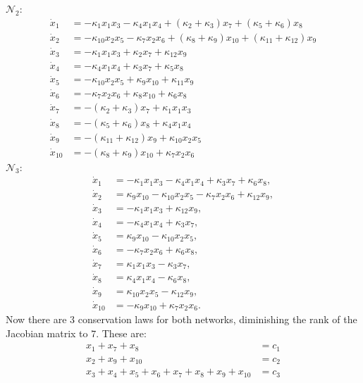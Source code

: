 $\mathcal{N}_2$:
\[
	\begin{aligned}
		\dot{x}_1&=-\kappa_{1}x_{1}x_{3}-\kappa_{4}x_{1}x_{4}+(\kappa_{2}+\kappa_{3})x_{7}+(\kappa_{5}+\kappa_{6})x_{8}\\\dot{x}_2&=-\kappa_{10}x_{2}x_{5}-\kappa_{7}x_{2}x_{6}+(\kappa_{8}+\kappa_{9})x_{10}+(\kappa_{11}+\kappa_{12})x_{9}\\\dot{x}_3&=-\kappa_1x_1x_3+\kappa_2x_7+\kappa_{12}x_9\\\dot{x}_4&=-\kappa_4x_1x_4+\kappa_3x_7+\kappa_5x_8\\\dot{x}_5&=-\kappa_{10}x_2x_5+\kappa_9x_{10}+\kappa_{11}x_9\\\dot{x}_6&=-\kappa_7x_2x_6+\kappa_8x_{10}+\kappa_6x_8\\\dot{x}_7&=-(\kappa_2+\kappa_3)x_7+\kappa_1x_1x_3\\\dot{x}_8&=-(\kappa_5+\kappa_6)x_8+\kappa_4x_1x_4\\\dot{x}_9&=-(\kappa_{11}+\kappa_{12})x_9+\kappa_{10}x_2x_5\\\dot{x}_{10}&=-(\kappa_8+\kappa_9)x_{10}+\kappa_7x_2x_6
	\end{aligned}
\]
$\mathcal{N}_3$:
\[
	\begin{aligned}
		\dot{x}_{1} &= -\kappa_{1} x_{1} x_{3} - \kappa_{4} x_{1} x_{4} + \kappa_{3} x_{7} + \kappa_{6} x_{8},\\
		\dot{x}_{2} &= \kappa_{9} x_{10} - \kappa_{10} x_{2} x_{5} - \kappa_{7} x_{2} x_{6} + \kappa_{12} x_{9},\\
		\dot{x}_{3} &= -\kappa_{1} x_{1} x_{3} + \kappa_{12} x_{9},\\
		\dot{x}_{4} &= -\kappa_{4} x_{1} x_{4} + \kappa_{3} x_{7},\\
		\dot{x}_{5} &= \kappa_{9} x_{10} - \kappa_{10} x_{2} x_{5},\\
		\dot{x}_{6} &= -\kappa_{7} x_{2} x_{6} + \kappa_{6} x_{8},\\
		\dot{x}_{7} &= \kappa_{1} x_{1} x_{3} - \kappa_{3} x_{7},\\
		\dot{x}_{8} &= \kappa_{4} x_{1} x_{4} - \kappa_{6} x_{8},\\
		\dot{x}_{9} &= \kappa_{10} x_{2} x_{5} - \kappa_{12} x_{9},\\
		\dot{x}_{10} &= -\kappa_{9} x_{10} + \kappa_{7} x_{2} x_{6}.
	\end{aligned}
\]
Now there are 3 conservation laws for both networks, diminishing the rank of the Jacobian matrix to $7$. These are:
\[
	\begin{aligned}
		x_{1}+x_{7}+x_{8}&=c_{1}\\x_{2}+x_{9}+x_{10}&=c_{2}\\x_{3}+x_{4}+x_{5}+x_{6}+x_{7}+x_{8}+x_{9}+x_{10}&=c_{3}
	\end{aligned}
\]
